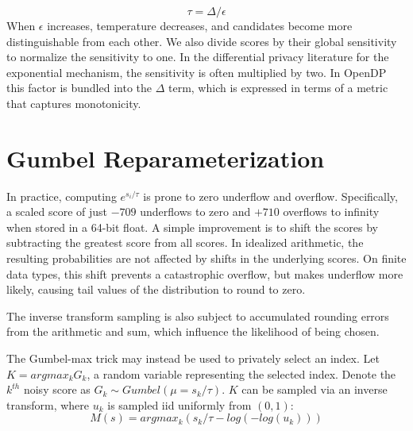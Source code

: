 \documentclass{article}
\begin{document}
\begin{equation}
    \tau = \Delta / \epsilon
\end{equation}
When $\epsilon$ increases, temperature decreases, and candidates become more distinguishable from each other.
We also divide scores by their global sensitivity to normalize the sensitivity to one.
In the differential privacy literature for the exponential mechanism, the sensitivity is often multiplied by two.
In OpenDP this factor is bundled into the $\Delta$ term, which is expressed in terms of a metric that captures monotonicity.

\section{Gumbel Reparameterization}
\label{gumbel-reparam}

In practice, computing $e^{s_i / \tau}$ is prone to zero underflow and overflow. 
Specifically, a scaled score of just $-709$ underflows to zero and $+710$ overflows to infinity when stored in a 64-bit float. 
A simple improvement is to shift the scores by subtracting the greatest score from all scores.
In idealized arithmetic, the resulting probabilities are not affected by shifts in the underlying scores.
On finite data types, this shift prevents a catastrophic overflow, but makes underflow more likely, 
causing tail values of the distribution to round to zero. 

The inverse transform sampling is also subject to accumulated rounding errors from the arithmetic and sum, 
which influence the likelihood of being chosen.

The Gumbel-max trick may instead be used to privately select an index.
Let $K = argmax_k G_k$, a random variable representing the selected index. 
Denote the $k^{th}$ noisy score as $G_k \sim Gumbel(\mu = s_k / \tau)$.
$K$ can be sampled via an inverse transform, where $u_k$ is sampled iid uniformly from $(0, 1)$:
\begin{equation}
    M(s) = argmax_k (s_k / \tau - log(-log(u_k)))
\end{equation}
\end{document}
